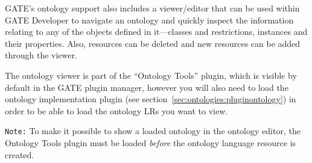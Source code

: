 {%
%
%
%
%
%
%
%
%


GATE's ontology support also includes a viewer/editor that can be used
within GATE Developer to navigate an ontology and quickly inspect the
information relating to any of the objects defined in it---classes and
restrictions, instances and their properties. Also, resources can be
deleted and new resources can be added through the viewer.

The ontology viewer is part of the ``Ontology Tools'' plugin, which is visible
by default in the GATE plugin manager, however you will also need to load the
ontology implementation plugin (see
section~\ref{sec:ontologies:pluginontology}) in order to be able to load the
ontology LRs you want to view.

\texttt{Note:} To make it possible to show a loaded ontology in the ontology
editor, the Ontology Tools plugin must be loaded
\emph{before} the ontology language resource is created.


}
